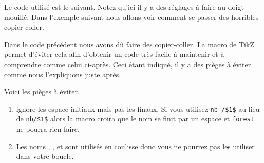 \documentclass[12pt,a4paper]{article}
\begin{document}
Le code utilisé est le suivant.
Notez qu'ici il y a des réglages à faire au doigt mouillé.
Dans l'exemple suivant nous allons voir comment se passer des horribles copier-coller.






Dans le code précédent nous avons dû faire des copier-coller. La macro  de TikZ permet d'éviter cela afin d'obtenir un code très facile à maintenir et à comprendre comme celui ci-après. Ceci étant indiqué, il y a des pièges à éviter comme nous l'expliquons juste après.

%


Voici les pièges à éviter.

\begin{enumerate}
	\item {} ignore les espace initiaux mais pas les finaux. Si vous utilisez \verb#nb /$1$# au lieu de  \verb#nb/$1$# alors la macro croira que le nom se finit par un espace et \verb#forest# ne pourra rien faire. 

	\item Les noms , ,  et  sont utilisés en coulisse donc vous ne pourrez pas les utiliser dans votre boucle.
\end{enumerate}
\end{document}
